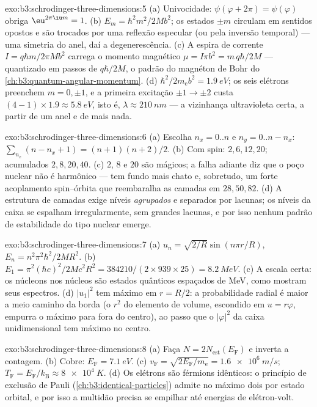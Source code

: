 \begin{solution}{exo:b3:schrodinger-three-dimensions:5}
(a) Univocidade: $\psi(\varphi + 2\pi) = \psi(\varphi)$ obriga
$\eu^{2\pi\iu m} = 1$. (b) $E_m = \hbar^2m^2/2Mb^2$; os estados $\pm
m$ circulam em sentidos opostos e são trocados por uma reflexão
especular (ou pela inversão temporal) --- uma simetria do anel, daí a
degenerescência. (c) A espira de corrente $I = q\hbar m/2\pi Mb^2$
carrega o momento magnético
$\mu = I\pi b^2 = m\,q\hbar/2M$ --- quantizado em passos de $q\hbar/2M$,
o padrão do magnéton de Bohr do
\cref{ch:b3:quantum-angular-momentum}.
(d) $\hbar^2/2m_{\text{e}}b^2 = \qty{1.9}{eV}$; os seis elétrons
preenchem $m = 0, \pm1$, e a primeira excitação $\pm1 \to \pm2$ custa
$(4-1) \times 1.9 \approx \qty{5.8}{eV}$, isto é, $\lambda \approx
\qty{210}{nm}$ --- a vizinhança ultravioleta certa, a partir de um anel
e de mais nada.
\end{solution}

\begin{solution}{exo:b3:schrodinger-three-dimensions:6}
(a) Escolha $n_x = 0..n$ e $n_y = 0..n - n_x$: $\sum_{n_x}(n - n_x
+ 1) = (n+1)(n+2)/2$. (b) Com spin: $2, 6, 12, 20$; acumulados $2,
8, 20, 40$. (c) $2$, $8$ e $20$ são mágicos; a falha adiante diz que o
poço nuclear não é harmônico --- tem fundo mais chato e, sobretudo, um
forte acoplamento spin--órbita que reembaralha as camadas em
$28, 50, 82$. (d) A estrutura de camadas exige níveis \emph{agrupados}
e separados por lacunas; os níveis da caixa se espalham
irregularmente, sem grandes lacunas, e por isso nenhum padrão de
estabilidade do tipo nuclear emerge.
\end{solution}

\begin{solution}{exo:b3:schrodinger-three-dimensions:7}
(a) $u_n = \sqrt{2/R}\sin(n\pi r/R)$, $E_n = n^2\pi^2\hbar^2/2MR^2$.
(b) $E_1 = \pi^2(\hbar c)^2/2Mc^2R^2 = 384210/(2 \times 939 \times
25) = \qty{8.2}{MeV}$. (c) A escala certa: os núcleons nos núcleos são
estados quânticos espaçados de MeV, como mostram seus espectros. (d)
$|u_1|^2$ tem máximo em $r = R/2$: a probabilidade radial é maior a
meio caminho da borda (o $r^2$ do elemento de volume, escondido em
$u = r\varphi$, empurra o máximo para fora do centro), ao passo que o
$|\varphi|^2$ da caixa unidimensional tem máximo no centro.
\end{solution}

\begin{solution}{exo:b3:schrodinger-three-dimensions:8}
(a) Faça $N = 2N_{\text{est}}(E_{\text{F}})$ e inverta a contagem.
(b) Cobre: $E_{\text{F}} = \qty{7.1}{eV}$. (c) $v_{\text{F}} =
\sqrt{2E_{\text{F}}/m_{\text{e}}} = \qty{1.6e6}{m/s}$;
$T_{\text{F}} = E_{\text{F}}/k_{\text{B}} \approx \qty{8e4}{K}$. (d)
Os elétrons são férmions idênticos: o princípio de exclusão de Pauli
(\cref{ch:b3:identical-particles}) admite no máximo dois por estado
orbital, e por isso a multidão precisa se empilhar até energias de
elétron-volt.
\end{solution}

